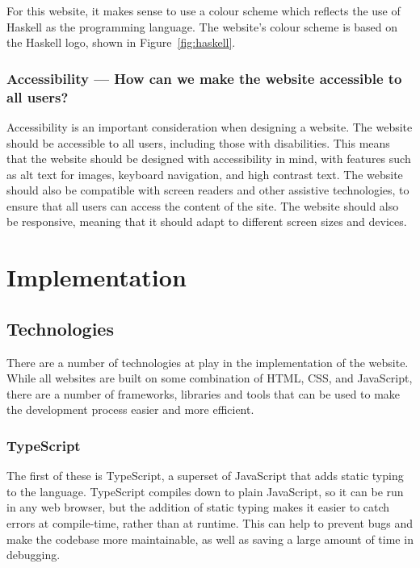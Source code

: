 \documentclass[../main.tex]{subfiles}
\begin{document}
                For this website, it makes sense to use a colour scheme which reflects the use
                    of Haskell as the programming language.
                The website's colour scheme is based on the Haskell logo, shown in
                    Figure~\ref{fig:haskell}.

            \subsubsection{Accessibility — How can we make the website accessible to all users?}
                Accessibility is an important consideration when designing a website.
                The website should be accessible to all users, including those with
                    disabilities.
                This means that the website should be designed with accessibility in mind, with
                    features such as alt text for images, keyboard navigation, and high contrast
                    text.
                The website should also be compatible with screen readers and other assistive
                    technologies, to ensure that all users can access the content of the site.
                The website should also be responsive, meaning that it should adapt to
                    different screen sizes and devices.

    \section{Implementation}
        \subsection{Technologies}
            There are a number of technologies at play in the implementation of the
                website.
            While all websites are built on some combination of HTML, CSS, and JavaScript,
                there are a number of frameworks, libraries and tools that can be used to make
                the development process easier and more efficient.

            \subsubsection{TypeScript}
                The first of these is TypeScript, a superset of JavaScript that adds static
                    typing to the language.
                TypeScript compiles down to plain JavaScript, so it can be run in any web
                    browser, but the addition of static typing makes it easier to catch errors at
                    compile-time, rather than at runtime.
                This can help to prevent bugs and make the codebase more maintainable, as well
                    as saving a large amount of time in debugging.
\end{document}
